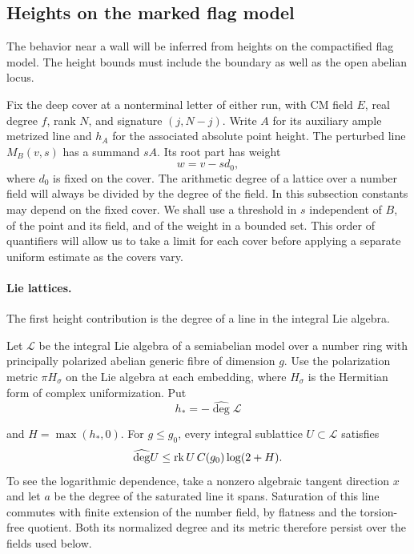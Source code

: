 \subsection{Heights on the marked flag model}
\label{subsec:flag-point-heights}

The behavior near a wall will be inferred from heights on the compactified flag model. The height bounds must include the boundary as well as the open abelian locus.

Fix the deep cover at a nonterminal letter of either run, with CM
field \(E\), real degree \(f\), rank \(N\), and signature \((j,N-j)\).
Write \(A\) for its auxiliary ample metrized line and \(h_A\) for
the associated absolute point height. The perturbed line \(M_B(v,s)\)
has a summand \(sA\). Its root part has weight
\[
 w=v-sd_0,
\]
where
\(d_0\) is fixed on the cover. The arithmetic degree of a lattice over
a number field will always be divided by the degree of the field.
In this subsection constants may depend on the fixed cover. We shall
use a threshold in \(s\) independent of \(B\), of the point and its
field, and of the weight in a bounded set. This order of quantifiers
will allow us to take a limit for each cover before applying a
separate uniform estimate as the covers vary.

\paragraph{Lie lattices.}

The first height contribution is the degree of a line in the integral Lie algebra.

Let \(\mathcal L\) be the integral Lie algebra of a semiabelian model
over a number ring with principally polarized abelian generic fibre of
dimension \(g\). Use the polarization metric \(\pi H_\sigma\) on the
Lie algebra at each embedding, where \(H_\sigma\) is the Hermitian
form of complex uniformization. Put
\[
 h_*=-\widehat{\deg}\mathcal L
\]

and \(H=\max(h_*,0)\). For \(g\le g_0\), every integral sublattice
\(U\subset\mathcal L\) satisfies
\begin{equation}\label{eq:flag-lie-slope}
  \widehat{\deg} U\le \operatorname{rk} U\,C(g_0)\log(2+H).
\end{equation}
To see the logarithmic dependence, take a nonzero algebraic tangent
direction \(x\) and let \(a\) be the degree of the saturated line it
spans. Saturation of this line commutes with finite extension of the
number field, by flatness and the torsion-free quotient. Both its
normalized degree and its metric therefore persist over the fields
used below.

